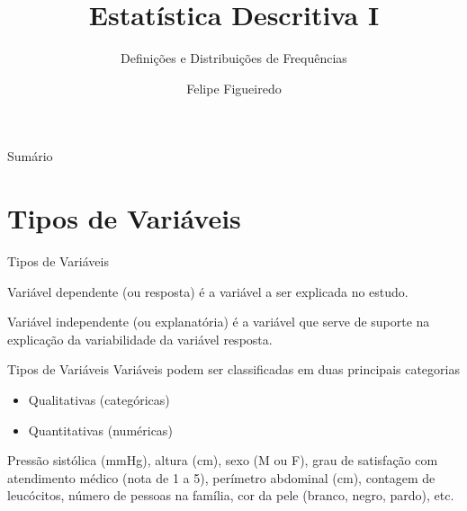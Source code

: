 \documentclass{beamer}
\title%
{Estatística Descritiva I}
\subtitle
{Definições e Distribuições de Frequências} %
\author%
{Felipe Figueiredo}%
\institute[INTO] %
{
Instituto Nacional de Traumatologia e Ortopedia}
\date%
{}
\begin{document}
\begin{frame}
  \titlepage
\end{frame}

\begin{frame}{Sumário}
  \tableofcontents
\end{frame}






\section{Tipos de Variáveis}

\begin{frame}{Tipos de Variáveis}
  \begin{definition}
    Variável \alert{dependente} (ou resposta) é a variável a ser
    explicada no estudo.
  \end{definition}
  \begin{definition}
    Variável \alert{independente} (ou explanatória) é a variável que
    serve de suporte na explicação da variabilidade da variável
    resposta.
  \end{definition}
\end{frame}

\begin{frame}{Tipos de Variáveis}
Variáveis podem ser classificadas em duas principais categorias
  \begin{itemize}
  \item Qualitativas (categóricas)
  \item Quantitativas (numéricas)
  \end{itemize}
  \begin{example}
    Pressão sistólica (mmHg), altura (cm), sexo (M ou F), grau de
    satisfação com atendimento médico (nota de 1 a 5), perímetro
    abdominal (cm), contagem de leucócitos, número de pessoas na
    família, cor da pele (branco, negro, pardo), etc.
  \end{example}

\end{frame}
\end{document}
